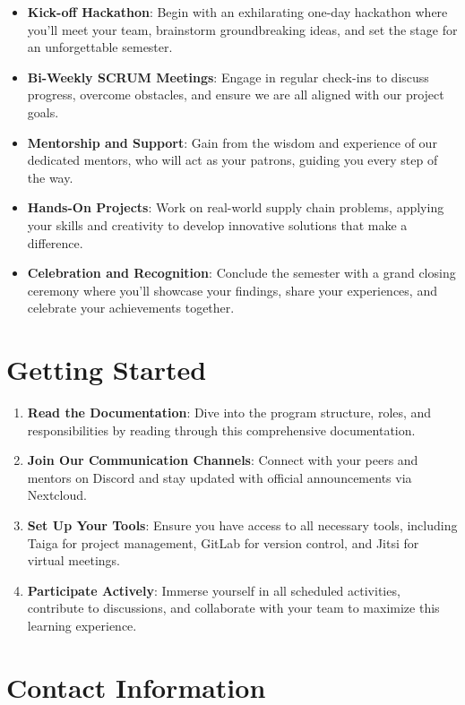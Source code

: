 \documentclass[
  letterpaper,
  DIV=11,
  numbers=noendperiod]{scrreprt}
\providecommand{\tightlist}{%
  \setlength{\itemsep}{0pt}\setlength{\parskip}{0pt}}\usepackage{longtable,booktabs,array}
\begin{document}
\begin{itemize}
\tightlist
\item
  \textbf{Kick-off Hackathon}: Begin with an exhilarating one-day
  hackathon where you'll meet your team, brainstorm groundbreaking
  ideas, and set the stage for an unforgettable semester.
\item
  \textbf{Bi-Weekly SCRUM Meetings}: Engage in regular check-ins to
  discuss progress, overcome obstacles, and ensure we are all aligned
  with our project goals.
\item
  \textbf{Mentorship and Support}: Gain from the wisdom and experience
  of our dedicated mentors, who will act as your patrons, guiding you
  every step of the way.
\item
  \textbf{Hands-On Projects}: Work on real-world supply chain problems,
  applying your skills and creativity to develop innovative solutions
  that make a difference.
\item
  \textbf{Celebration and Recognition}: Conclude the semester with a
  grand closing ceremony where you'll showcase your findings, share your
  experiences, and celebrate your achievements together.
\end{itemize}

\section{Getting Started}\label{getting-started}

\begin{enumerate}
\def\labelenumi{\arabic{enumi}.}
\tightlist
\item
  \textbf{Read the Documentation}: Dive into the program structure,
  roles, and responsibilities by reading through this comprehensive
  documentation.
\item
  \textbf{Join Our Communication Channels}: Connect with your peers and
  mentors on Discord and stay updated with official announcements via
  Nextcloud.
\item
  \textbf{Set Up Your Tools}: Ensure you have access to all necessary
  tools, including Taiga for project management, GitLab for version
  control, and Jitsi for virtual meetings.
\item
  \textbf{Participate Actively}: Immerse yourself in all scheduled
  activities, contribute to discussions, and collaborate with your team
  to maximize this learning experience.
\end{enumerate}

\section{Contact Information}\label{contact-information}
\end{document}
